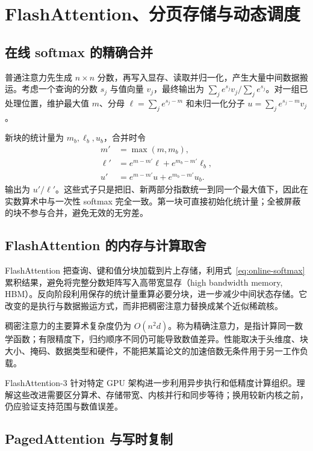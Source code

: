 \setcounter{chapter}{22} %
\chapter{FlashAttention、分页存储与动态调度}
\label{ch:efficientattention}

\section{在线 softmax 的精确合并}

普通注意力先生成 $n\times n$ 分数，再写入显存、读取并归一化，产生大量中间数据搬运。考虑一个查询的分数 $s_j$ 与值向量 $v_j$，最终输出为 $\sum_je^{s_j}v_j/\sum_je^{s_j}$。对一组已处理位置，维护最大值 $m$、分母 $\ell=\sum_je^{s_j-m}$ 和未归一化分子 $u=\sum_je^{s_j-m}v_j$。

新块的统计量为 $m_b,\ell_b,u_b$，合并时令
\begin{align}
m'&=\max(m,m_b),\\
\ell'&=e^{m-m'}\ell+e^{m_b-m'}\ell_b,\\
u'&=e^{m-m'}u+e^{m_b-m'}u_b.
\label{eq:online-softmax}
\end{align}
输出为 $u'/\ell'$。这些式子只是把旧、新两部分指数统一到同一个最大值下，因此在实数算术中与一次性 softmax 完全一致。第一块可直接初始化统计量；全被屏蔽的块不参与合并，避免无效的无穷差。

\section{FlashAttention 的内存与计算取舍}

FlashAttention 把查询、键和值分块加载到片上存储，利用式~\eqref{eq:online-softmax} 累积结果，避免将完整分数矩阵写入高带宽显存（high bandwidth memory, HBM）\cite{flash}。反向阶段利用保存的统计量重算必要分块，进一步减少中间状态存储。它改变的是执行与数据搬运方式，而非把稠密注意力替换成某个近似稀疏核。

稠密注意力的主要算术复杂度仍为 $O(n^2d)$。称为精确注意力，是指计算同一数学函数；有限精度下，归约顺序不同仍可能导致数值差异。性能取决于头维度、块大小、掩码、数据类型和硬件，不能把某篇论文的加速倍数无条件用于另一工作负载。

FlashAttention-3 针对特定 GPU 架构进一步利用异步执行和低精度计算组织\cite{flash3}。理解这些改进需要区分算术、存储带宽、内核并行和同步等待；换用较新内核之前，仍应验证支持范围与数值误差。

\section{PagedAttention 与写时复制}

